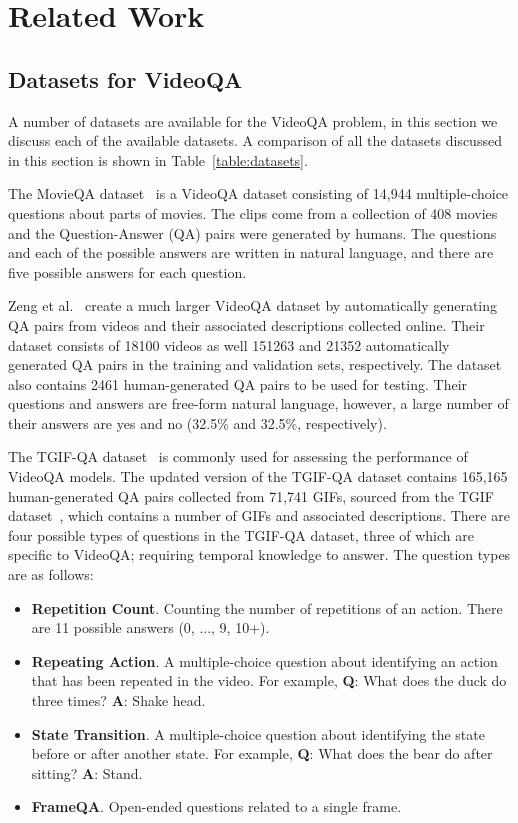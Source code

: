 \documentclass[../interim.tex]{subfiles}
\begin{document}
\chapter{Related Work} \label{section:related}

\section{Datasets for VideoQA}

A number of datasets are available for the VideoQA problem, in this section we discuss each of the available datasets. A comparison of all the datasets discussed in this section is shown in Table~\ref{table:datasets}.

The MovieQA dataset~\cite{dataset:movie-qa} is a VideoQA dataset consisting of 14,944 multiple-choice questions about parts of movies. The clips come from a collection of 408 movies and the Question-Answer (QA) pairs were generated by humans. The questions and each of the possible answers are written in natural language, and there are five possible answers for each question.

Zeng et al.~\cite{dataset:zeng} create a much larger VideoQA dataset by automatically generating QA pairs from videos and their associated descriptions collected online. Their dataset consists of 18100 videos as well 151263 and 21352 automatically generated QA pairs in the training and validation sets, respectively. The dataset also contains 2461 human-generated QA pairs to be used for testing. Their questions and answers are free-form natural language, however, a large number of their answers are yes and no (32.5\% and 32.5\%, respectively).

The TGIF-QA dataset~\cite{dataset:tgif-qa} is commonly used for assessing the performance of VideoQA models. The updated version of the TGIF-QA dataset contains 165,165 human-generated QA pairs collected from 71,741 GIFs, sourced from the TGIF dataset~\cite{dataset:tgif}, which contains a number of GIFs and associated descriptions. There are four possible types of questions in the TGIF-QA dataset, three of which are specific to VideoQA; requiring temporal knowledge to answer. The question types are as follows:
\begin{itemize}
  \item \textbf{Repetition Count}. Counting the number of repetitions of an action. There are 11 possible answers (0, ..., 9, 10+).

  \item \textbf{Repeating Action}. A multiple-choice question about identifying an action that has been repeated in the video. For example, \textbf{Q}: What does the duck do three times? \textbf{A}: Shake head.

  \item \textbf{State Transition}. A multiple-choice question about identifying the state before or after another state. For example, \textbf{Q}: What does the bear do after sitting? \textbf{A}: Stand.

  \item \textbf{FrameQA}. Open-ended questions related to a single frame.
\end{itemize}
\end{document}
